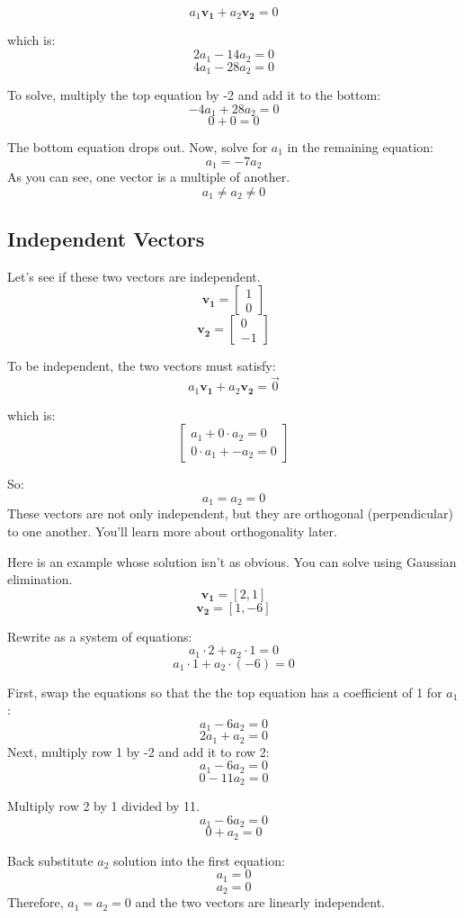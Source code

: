 	$$a_1 \mathbf{v_1} + a_2 \mathbf{v_2} = 0$$

which is:
	$$2a_1 -14a_2 = 0$$
	$$4a_1 -28a_2 = 0$$

To solve, multiply the top equation by -2 and add it to the bottom: 
$$-4a_1 + 28a_2 = 0 $$
$$ 0  + 0     = 0 $$

The bottom equation drops out. Now, solve for $a_1$ in the remaining equation:
$$a_1 = -7a_2$$
As you can see, one vector is a multiple of another. $$a_1 \neq a_2 \neq 0$$

\subsection{Independent Vectors}
Let's see if these two vectors are independent.
$$\mathbf{v_1} = \begin{bmatrix}
1 \\
0
\end{bmatrix}$$
$$\mathbf{v_2} = \begin{bmatrix}
0 \\
-1
\end{bmatrix}$$

To be independent, the two vectors must satisfy:
	$$a_1 \mathbf{v_1} + a_2 \mathbf{v_2} = \vec{0}$$
	
which is:
$$\begin{bmatrix}
	a_1 + 0\cdot a_2 = 0 \\
	0\cdot a_1 + -a_2 = 0
\end{bmatrix}$$

So:
$$a_1 = a_2 = 0$$
These vectors are not only independent, but they are orthogonal (perpendicular)
to one another. You'll learn more about orthogonality later.

Here is an example whose solution isn't as obvious. You can solve using 
Gaussian elimination.
$$\mathbf{v_1} = [2, 1]$$
$$\mathbf{v_2} = [1, -6]$$

Rewrite as a system of equations:
$$a_1\cdot 2 + a_2 \cdot 1 = 0 $$
$$a_1 \cdot 1 + a_2 \cdot (-6) = 0$$

First, swap the equations so that the the top equation has a coefficient of 1 
for $a_1$:
$$a_1 - 6a_2 = 0$$ 
$$2a_1 + a_2 = 0$$ 
Next, multiply row 1 by -2 and add it to row 2:
$$a_1 - 6a_2 = 0$$ 
$$0  - 11a_2 = 0$$ 

Multiply row 2 by 1 divided by 11.
$$a_1 - 6a_2 = 0$$ 
$$0 + a_2 = 0$$ 

Back substitute $a_2$ solution into the first equation:
$$a_1  = 0$$
$$a_2 = 0$$ 
Therefore, $a_1 = a_2 = 0$ and the two vectors are linearly independent.

